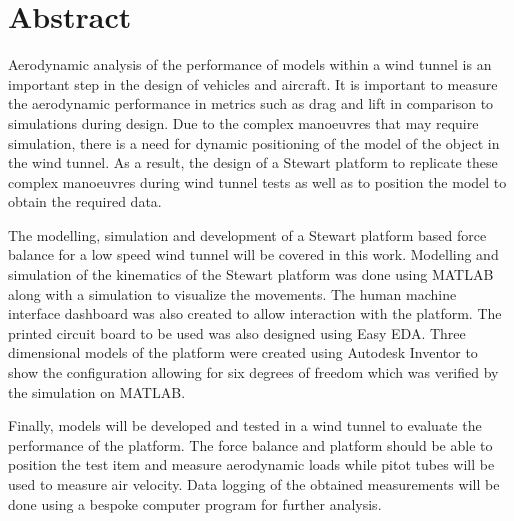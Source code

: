 
\section*{Abstract}
\label{sec:Abstract}
Aerodynamic analysis of the performance of models within a wind tunnel is an important step in the design of vehicles and aircraft. It is important to measure the aerodynamic performance in metrics such as drag and lift in comparison to simulations during design.
Due to the complex manoeuvres that may require simulation, there is a need for dynamic positioning of the model of the object in the wind tunnel. As a result, the design of a Stewart platform to replicate these complex manoeuvres during wind tunnel tests as well as to position the model to obtain the required data.

The modelling, simulation and development of a Stewart platform
based force balance for a low speed wind tunnel will be covered in this work. 
Modelling and simulation of the kinematics of the Stewart platform was done using MATLAB along with a simulation to visualize the movements. 
The human machine interface dashboard was also created to allow interaction with the platform. The printed circuit board to be used was also designed using Easy EDA. Three dimensional models of the platform were created using Autodesk Inventor to show the configuration allowing for six degrees of freedom which was verified by the simulation on MATLAB.

Finally, models will be developed and tested in a wind tunnel to evaluate the performance
of the platform. The force balance and platform should be able to position the test
item and measure aerodynamic loads while pitot tubes will be used to measure air velocity. Data logging of the obtained measurements will be done using a bespoke computer program for further analysis.


